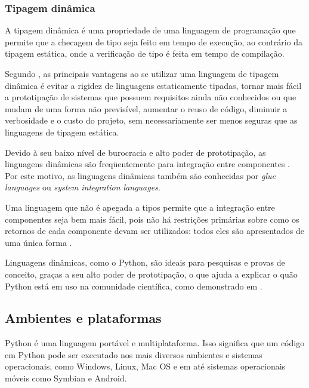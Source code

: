 \subsubsection{Tipagem dinâmica}

A tipagem dinâmica é uma propriedade de uma linguagem de programação que permite que a checagem de tipo seja feito em tempo de execução, ao contrário da tipagem estática, onde a verificação de tipo é feita em tempo de compilação.

Segundo \cite{dynamic_langs}, as principais vantagens ao se utilizar uma linguagem de tipagem dinâmica é evitar a rigidez de linguagens estaticamente tipadas, tornar mais fácil a prototipação de sistemas que possuem requisitos ainda não conhecidos ou que mudam de uma forma não previsível, aumentar o reuso de código, diminuir a verbosidade e o custo do projeto, sem necessariamente ser menos seguras que as linguagens de tipagem estática.

Devido à seu baixo nível de burocracia e alto poder de prototipação, as linguagens dinâmicas são freqüentemente para integração entre componentes \cite{scripting}. Por este motivo, as linguagens dinâmicas também são conhecidas por \emph{glue languages} ou \emph{system integration languages}.

Uma linguagem que não é apegada a tipos permite que a integração entre componentes seja bem mais fácil, pois não há restrições primárias sobre como os retornos de cada componente devam ser utilizados: todos eles são apresentados de uma única forma \cite{scripting}.

Linguagens dinâmicas, como o Python, são ideais para pesquisas e provas de conceito, graças a seu alto poder de prototipação, o que ajuda a explicar o quão Python está em uso na comunidade científica, como demonstrado em \cite{python_scientific_world}.

\subsection{Ambientes e plataformas}

Python é uma linguagem portável e multiplataforma. Isso significa que um código em Python pode ser executado nos mais diversos ambientes e sistemas operacionais, como Windows, Linux, Mac OS e em até sistemas operacionais móveis como Symbian e Android.

